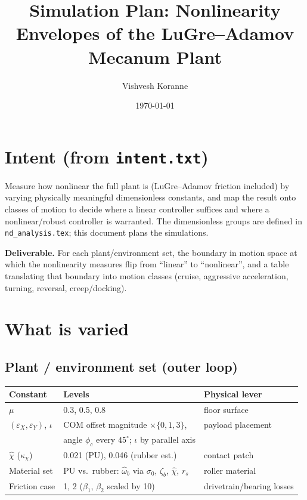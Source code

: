 \documentclass[11pt]{article}
\title{Simulation Plan: Nonlinearity Envelopes of the LuGre--Adamov Mecanum Plant}
\author{Vishvesh Koranne}
\date{\today}
\begin{document}
\maketitle

\section{Intent (from \texttt{intent.txt})}
Measure how nonlinear the full plant is (LuGre--Adamov friction included) by
varying physically meaningful dimensionless constants, and map the result onto
classes of motion to decide where a linear controller suffices and where a
nonlinear/robust controller is warranted. The dimensionless groups are defined in
\texttt{nd\_analysis.tex}; this document plans the simulations.

\medskip
\textbf{Deliverable.} For each plant/environment set, the boundary in motion space
at which the nonlinearity measures flip from ``linear'' to ``nonlinear'', and a
table translating that boundary into motion classes (cruise, aggressive
acceleration, turning, reversal, creep/docking).

\section{What is varied}

\subsection{Plant / environment set (outer loop)}
\begin{tabular}{@{}lll@{}}
\toprule
Constant & Levels & Physical lever \\
\midrule
$\mu$ & 0.3, 0.5, 0.8 & floor surface \\
$(\varepsilon_X, \varepsilon_Y)$, $\iota$ & COM offset magnitude $\times\{0, 1, 3\}$, & payload placement \\
 & angle $\phi_c$ every $45^\circ$; $\iota$ by parallel axis & \\
$\hat\chi$ ($\kappa_\chi$) & 0.021 (PU), 0.046 (rubber est.) & contact patch \\
Material set & PU vs.\ rubber: $\hat\omega_b$ via $\sigma_0$, $\zeta_b$, $\hat\chi$, $r_s$ & roller material \\
Friction case & 1, 2 ($\beta_1$, $\beta_2$ scaled by 10) & drivetrain/bearing losses \\
\bottomrule
\end{tabular}
\end{document}

